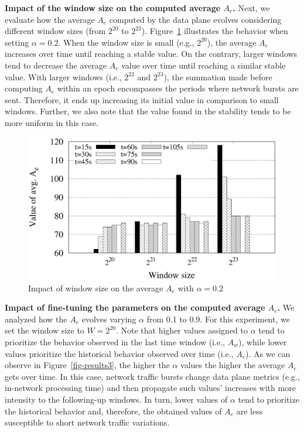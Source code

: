 \noindent \textbf{Impact of the window size on the computed average $A_e$.} Next, we evaluate how the average $A_e$ computed by the data plane evolves considering different window sizes (from $2^{20}$ to $2^{23}$). Figure~\ref{fig-result2} illustrates the behavior when setting $\alpha = 0.2$. When the window size is small (e.g., $2^{20}$), the average $A_e$ increases over time until reaching a stable value. On the contrary, larger windows tend to decrease the average $A_e$ value over time until reaching a similar stable value. With larger windows (i.e., $2^{22}$ and $2^{23}$), the summation made before computing $A_e$ within an epoch encompasses the periods where network bursts are sent. Therefore, it ends up increasing its initial value in comparison to small windows. Further, we also note that the value found in the stability tends to be more uniform in this case.\\ %

\begin{figure}[!t]
\centering
            \includegraphics[scale=0.38]{results/g4b.eps}
    
\caption{Impact of window size on the average $A_e$ with $\alpha = 0.2$}
  \label{fig-result2}
\end{figure}

\noindent \textbf{Impact of fine-tuning the parameters on the computed average $A_e$.} We analyzed how the $A_e$ evolves varying $\alpha$ from 0.1 to 0.9. For this experiment, we set the window size to $W = 2^{20}$. Note that higher values assigned to $\alpha$ tend to prioritize the behavior observed in the last time window (i.e., $A_w$), while lower values prioritize the historical behavior observed over time (i.e., $A_e$). As we can observe in Figure~\ref{fig-results3}, the higher the $\alpha$ values the higher the average $A_e$ gets over time. In this case, network traffic bursts change data plane metrics (e.g., in-network processing time) and then propagate such values' increases with more intensity to the following-up windows. In turn, lower values of $\alpha$ tend to prioritize the historical behavior and, therefore, the obtained values of $A_e$ are less susceptible to short network traffic variations.\\

